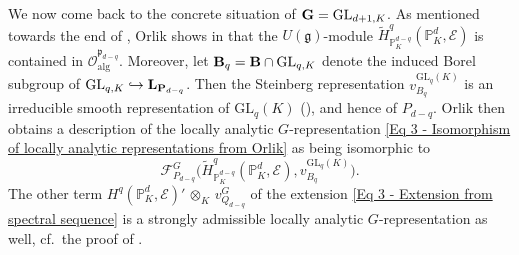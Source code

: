 \documentclass[a4paper, reqno, 10pt]{amsart}
\theoremstyle{definition}
\numberwithin{equation}{section}
\newcommand{\botimes}[1]{{\,\otimes_{#1}\,}}
\newcommand{\defeq}{\vcentcolon=}
\newcommand{\GL}{{\mathrm{GL}}}
\newcommand{\ra}{\rightarrow}
\newcommand{\BP}{{\mathbb {P}}}
\newcommand{\CE}{{\mathcal {E}}}
\newcommand{\CF}{{\mathcal {F}}}
\newcommand{\CO}{{\mathcal {O}}}
\newcommand{\bB}{{\mathrm{\bf B}}}
\newcommand{\bG}{{\mathrm{\bf G}}}
\newcommand{\bL}{{\mathrm{\bf L}}}
\newcommand{\bP}{{\mathrm{\bf P}}}
\newcommand{\Fg}{{\mathfrak {g}}}
\newcommand{\Fp}{{\mathfrak {p}}}
\newcommand{\alg}{{\mathrm{alg}}}
\begin{document}
We now come back to the concrete situation of $\bG = \GL_{d+1,K}$.
As mentioned towards the end of , Orlik shows in \cite[Lemma 1.2.1]{Orlik08EquivVBDrinfeldUpHalfSp} that the $U(\Fg)$-module $\widetilde{H}^{q}_{\BP_K^{d-q}} (\BP_K^d, \CE)$ is contained in $\CO_\alg^{\Fp_{d-q}}$.
Moreover, let $\bB_q = \bB \cap \GL_{q,K}$ denote the induced Borel subgroup of $\GL_{q,K} \hookrightarrow \bL_{\bP_{d-q}}$.
Then the Steinberg representation $v^{\GL_{q}(K)}_{B_{q}}$ is an irreducible smooth representation of $\GL_{q}(K)$ (\cite[Thm.\ 2 (a)]{Casselman74pAdicVanishingThmGarland}), and hence of $P_{d-q}$.
Orlik then obtains a description of the locally analytic $G$-representation \eqref{Eq 3 - Isomorphism of locally analytic representations from Orlik} as being isomorphic to 
\begin{equation}\label{Eq 3 - Concrete description via Orlik-Strauch functors}
	\CF^{G}_{P_{d-q}} \Big( \widetilde{H}^{q}_{\BP_K^{d-q}} (\BP_K^d, \CE) , v^{\GL_{q}(K)}_{B_{q}} \Big) .
\end{equation}
The other term $H^q (\BP_K^d, \CE)' \botimes{K} v^G_{Q_{d-q}}$ of the extension \eqref{Eq 3 - Extension from spectral sequence} is a strongly admissible locally analytic $G$-representation as well, cf.\ the proof of \cite[Lemma 2.4]{OrlikStrauch15JordanHoelderSerLocAnRep}.
\end{document}

